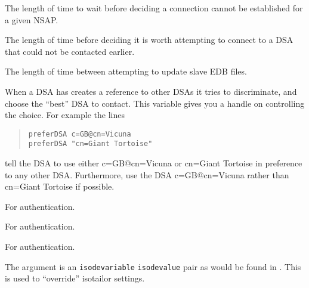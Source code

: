 \begin{describe}
\item[\verb"nsaptime":] The length of time to wait before deciding a
connection cannot be established for a given NSAP.

\item[\verb"retrytime":] The length of time before deciding it is worth
attempting to connect to a DSA that could not be contacted earlier.

\item[\verb"slavetime":] The length of time between attempting to update
slave EDB files.

\item[\verb"preferdsa":] When a DSA has creates a reference to other DSAs it
tries to discriminate, and choose the ``best'' DSA to contact.
This variable gives you a handle on controlling the choice. For example the
lines
\begin{quote}\begin{verbatim}
preferDSA c=GB@cn=Vicuna
preferDSA "cn=Giant Tortoise"
\end{verbatim}\end{quote}
tell the DSA to use either c=GB@cn=Vicuna or cn=Giant Tortoise in
preference to any other DSA.  Furthermore, use the DSA c=GB@cn=Vicuna
rather than cn=Giant Tortoise if possible.

\item[\verb"cainfo":] For authentication.

\item[\verb"secretkey":] For authentication.

\item[\verb"bindwindow":] For authentication.

\item [\verb"isode":]
The argument is an \verb"isodevariable" \verb"isodevalue" pair as would 
be found in .  This is used to ``override'' isotailor
settings.


\end{describe}
